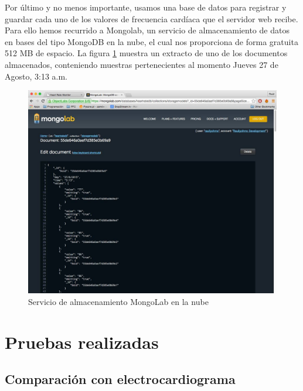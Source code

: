 Por último y no menos importante, usamos una base de datos para registrar y guardar cada uno de los valores de frecuencia cardíaca que el servidor web recibe. Para ello hemos recurrido a Mongolab, un servicio de almacenamiento de datos en bases del tipo MongoDB en la nube, el cual nos proporciona de forma gratuita 512 MB de espacio.
La figura \ref{fig:web:dB} muestra un extracto de uno de los documentos almacenados, conteniendo muestras pertenecientes al momento Jueves 27 de Agosto, 3:13 a.m.

\begin{figure}[h] \centering
	\includegraphics[width=15cm]{graphs/webDB.png} \caption{Servicio de almacenamiento MongoLab en la nube}\label{fig:web:dB}
\end{figure}

\section{Pruebas realizadas}
      
\subsection{Comparación con electrocardiograma}

